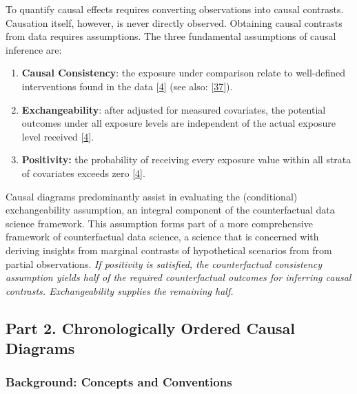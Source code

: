 \documentclass[
  singlecolumn]{article}
\begin{document}
To quantify causal effects requires converting observations into causal
contrasts. Causation itself, however, is never directly observed.
Obtaining causal contrasts from data requires assumptions. The three
fundamental assumptions of causal inference are:

\begin{enumerate}
\def\labelenumi{\arabic{enumi}.}
\item
  \textbf{Causal Consistency}: the exposure under comparison relate to
  well-defined interventions found in the data
  {[}\protect\hyperlink{ref-hernuxe1n2023}{4}{]} (see also:
  {[}\protect\hyperlink{ref-chatton2020}{37}{]}).
\item
  \textbf{Exchangeability}: after adjusted for measured covariates, the
  potential outcomes under all exposure levels are independent of the
  actual exposure level received
  {[}\protect\hyperlink{ref-hernuxe1n2023}{4}{]}.
\item
  \textbf{Positivity:} the probability of receiving every exposure value
  within all strata of covariates exceeds zero
  {[}\protect\hyperlink{ref-hernuxe1n2023}{4}{]}.
\end{enumerate}

Causal diagrams predominantly assist in evaluating the (conditional)
exchangeability assumption, an integral component of the counterfactual
data science framework. This assumption forms part of a more
comprehensive framework of counterfactual data science, a science that
is concerned with deriving insights from marginal contrasts of
hypothetical scenarios from from partial observations. \emph{If
positivity is satisfied, the counterfactual consistency assumption
yields half of the required counterfactual outcomes for inferring causal
contrasts. Exchangeability supplies the remaining half.}

\hypertarget{part-2.-chronologically-ordered-causal-diagrams}{%
\subsection{Part 2. Chronologically Ordered Causal
Diagrams}\label{part-2.-chronologically-ordered-causal-diagrams}}

\hypertarget{background-concepts-and-conventions}{%
\subsubsection{Background: Concepts and
Conventions}\label{background-concepts-and-conventions}}
\end{document}
